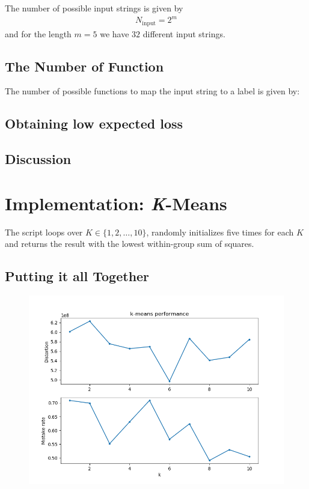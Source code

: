 \documentclass[12pt]{article}
\begin{document}
The number of possible input strings is given by 
\begin{align}
N_\text{input}=2^m 
\end{align}
and for the length $m=5$ we have $32$ different input strings.

\subsection{The Number of Function}

The number of possible functions to map the input string to a label is given by:

\subsection{Obtaining low expected loss}

\subsection{Discussion}

\section{Implementation: \textit{K}-Means}
The script loops over $K \in \{1,2,\dots,10\}$, randomly initializes five times for each $K$ and returns the result with the lowest within-group sum of squares. 
\subsection{Putting it all Together}
\begin{figure}
	\centering
	\includegraphics[width=\linewidth]{../Problem_4/Run_2.png}

\end{figure}






\end{document}
